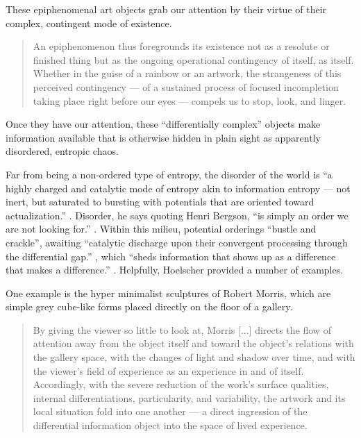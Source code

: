 \documentclass[letterpaper]{article}
\begin{document}
    These epiphenomenal art objects grab our attention by their virtue of their complex, contingent mode of existence.

    \begin{quote}
        An epiphenomenon thus foregrounds its existence not as a resolute or finished thing but as the ongoing operational contingency of itself, as itself. Whether in the guise of a rainbow or an artwork, the strangeness of this perceived contingency — of a sustained process of focused incompletion taking place right before our eyes — compels us to stop, look, and linger.
    \end{quote}

    Once they have our attention, these “differentially complex” \citep[p.74]{HoelscherArtAsInfrmtn2021} objects make information available that is otherwise hidden in plain sight as apparently disordered, entropic chaos.
    
    Far from being a non-ordered type of entropy, the disorder of the world is “a highly charged and catalytic mode of entropy akin to information entropy — not inert, but saturated to bursting with potentials that are oriented toward actualization.” \citep[p.72]{HoelscherArtAsInfrmtn2021}. Disorder, he says quoting Henri Bergson, “is simply an order we are not looking for.” \citep[p.73]{HoelscherArtAsInfrmtn2021}. Within this milieu, potential orderings “bustle and crackle”, awaiting “catalytic discharge upon their convergent processing through the differential gap.” \citep[p.73]{HoelscherArtAsInfrmtn2021}, which “sheds information that shows up as a difference that makes a difference.” \citep[p.75]{HoelscherArtAsInfrmtn2021}. Helpfully, Hoelscher provided a number of examples.

    One example is the hyper minimalist sculptures of Robert Morris, which are simple grey cube-like forms placed directly on the floor of a gallery.

    \begin{quote}
        By giving the viewer so little to look at, Morris [...] directs the flow of attention away from the object itself and toward the object's relations with the gallery space, with the changes of light and shadow over time, and with the viewer's field of experience as an experience in and of itself. Accordingly, with the severe reduction of the work's surface qualities, internal differentiations, particularity, and variability, the artwork and its local situation fold into one another — a direct ingression of the differential information object into the space of lived experience. \citep[p.78]{HoelscherArtAsInfrmtn2021}
    \end{quote}
\end{document}
